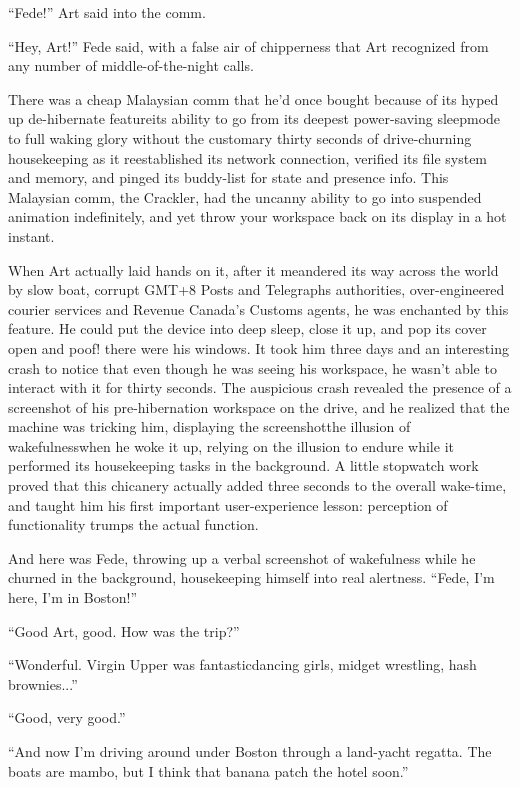 “Fede!” Art said into the comm.

“Hey, Art!” Fede said, with a false air of chipperness that Art
recognized from any number of middle-of-the-night calls.

There was a cheap Malaysian comm that he’d once bought because of
its hyped up de-hibernate feature{\dash}its ability to go from its
deepest power-saving sleepmode to full waking glory without the
customary thirty seconds of drive-churning housekeeping as it
reestablished its network connection, verified its file system and
memory, and pinged its buddy-list for state and presence info. This
Malaysian comm, the Crackler, had the uncanny ability to go into
suspended animation indefinitely, and yet throw your workspace back
on its display in a hot instant.

When Art actually laid hands on it, after it meandered its way
across the world by slow boat, corrupt GMT+8 Posts and Telegraphs
authorities, over-engineered courier services and Revenue Canada’s
Customs agents, he was enchanted by this feature. He could put the
device into deep sleep, close it up, and pop its cover open and
poof! there were his windows. It took him three days and an
interesting crash to notice that even though he was seeing his
workspace, he wasn’t able to interact with it for thirty seconds.
The auspicious crash revealed the presence of a screenshot of his
pre-hibernation workspace on the drive, and he realized that the
machine was tricking him, displaying the screenshot{\dash}the illusion of
wakefulness{\dash}when he woke it up, relying on the illusion to endure
while it performed its housekeeping tasks in the background. A
little stopwatch work proved that this chicanery actually added
three seconds to the overall wake-time, and taught him his first
important user-experience lesson: perception of functionality
trumps the actual function.

And here was Fede, throwing up a verbal screenshot of wakefulness
while he churned in the background, housekeeping himself into real
alertness. “Fede, I’m here, I’m in Boston!”

“Good Art, good. How was the trip?”

“Wonderful. Virgin Upper was fantastic{\dash}dancing girls, midget
wrestling, hash brownies...”

“Good, very good.”

“And now I’m driving around under Boston through a land-yacht
regatta. The boats are mambo, but I think that banana patch the
hotel soon.”

